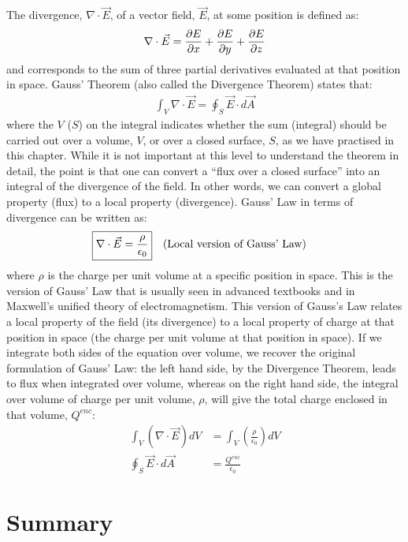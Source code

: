 The divergence, $\nabla \cdot \vec E$, of a vector field, $\vec E$, at some position is defined as:
\begin{align*}
\nabla \cdot \vec E=\frac{\partial E}{\partial x}+\frac{\partial E}{\partial y}+\frac{\partial E}{\partial z}
\end{align*}
and corresponds to the sum of three partial derivatives evaluated at that position in space. Gauss' Theorem (also called the Divergence Theorem) states that:
\begin{align*}
\int_V \nabla \cdot \vec E = \oint_S \vec E \cdot d\vec A
\end{align*}
where the $V$ ($S$) on the integral indicates whether the sum (integral) should be carried out over a volume, $V$, or over a closed surface, $S$, as we have practised in this chapter. While it is not important at this level to understand the theorem in detail, the point is that one can convert a ``flux over a closed surface'' into an integral of the divergence of the field. In other words, we can convert a global property (flux) to a local property (divergence). Gauss' Law in terms of divergence can be written as:
\begin{align*}
\Aboxed{\nabla \cdot \vec E &= \frac{\rho}{\epsilon_0}}\quad \text{(Local version of Gauss' Law)}
\end{align*}
where $\rho$ is the charge per unit volume at a specific position in space. This is the version of Gauss' Law that is usually seen in advanced textbooks and in Maxwell's unified theory of electromagnetism. This version of Gauss's Law relates a local property of the field (its divergence) to a local property of charge at that position in space (the charge per unit volume at that position in space). If we integrate both sides of the equation over volume, we recover the original formulation of Gauss' Law: the left hand side, by the Divergence Theorem, leads to flux when integrated over volume, whereas on the right hand side, the integral over volume of charge per unit volume, $\rho$, will give the total charge enclosed in that volume, $Q^{enc}$:
\begin{align*}
\int_V  \left(\nabla \cdot \vec E \right)dV&= \int_V \left(\frac{\rho}{\epsilon_0}\right) dV\\
\oint_S \vec E \cdot d\vec A &=\frac{Q^{enc}}{\epsilon_0}
\end{align*}

\newpage
\section{Summary}

